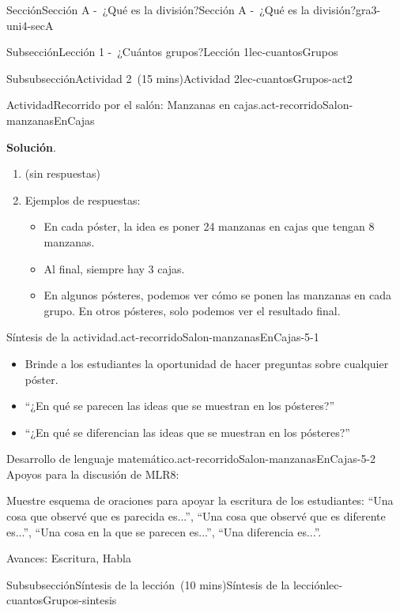 \documentclass[oneside,10pt,]{article}
\newcommand{\blocktitlefont}{\relax}
\begin{document}
\begin{sectionptx}{Sección}{Sección A -~¿Qué es la división?}{}{Sección A -~¿Qué es la división?}{}{}{gra3-uni4-secA}
\begin{subsectionptx}{Subsección}{Lección 1 -~¿Cuántos grupos?}{}{Lección 1}{}{}{lec-cuantosGrupos}
\begin{subsubsectionptx}{Subsubsección}{Actividad 2~(15 mins)}{}{Actividad 2}{}{}{lec-cuantosGrupos-act2}
\begin{activity}{Actividad}{Recorrido por el salón: Manzanas en cajas.}{act-recorridoSalon-manzanasEnCajas}
\begin{enumerate}
\end{enumerate}
%
\par\smallskip%
\noindent\textbf{\blocktitlefont Solución}.\hypertarget{act-recorridoSalon-manzanasEnCajas-3}{}\quad{}%
\begin{enumerate}
\item{}(sin respuestas)%
\item{}Ejemplos de respuestas:%
\begin{itemize}[label=\textbullet]
\item{}En cada póster, la idea es poner 24 manzanas en cajas que tengan 8 manzanas.%
\item{}Al final, siempre hay 3 cajas.%
\item{}En algunos pósteres, podemos ver cómo se ponen las manzanas en cada grupo. En otros pósteres, solo podemos ver el resultado final.%
\end{itemize}
%
\end{enumerate}
\end{activity}%
\par
\begin{paragraphs}{Síntesis de la actividad.}{act-recorridoSalon-manzanasEnCajas-5-1}%
%
\begin{itemize}[label=\textbullet]
\item{}Brinde a los estudiantes la oportunidad de hacer preguntas sobre cualquier póster.%
\item{}``¿En qué se parecen las ideas que se muestran en los pósteres?''%
\item{}``¿En qué se diferencian las ideas que se muestran en los pósteres?''%
\end{itemize}
\end{paragraphs}%
\begin{paragraphs}{Desarrollo de lenguaje matemático.}{act-recorridoSalon-manzanasEnCajas-5-2}%
Apoyos para la discusión de MLR8:%
\par
Muestre esquema de oraciones para apoyar la escritura de los estudiantes: ``Una cosa que observé que es parecida es...'', ``Una cosa que observé que es diferente es...'', ``Una cosa en la que se parecen es...'', ``Una diferencia es...''.%
\par
Avances: Escritura, Habla%
\end{paragraphs}%
\end{subsubsectionptx}
%
%
\typeout{************************************************}
\typeout{************************************************}
%
\begin{subsubsectionptx}{Subsubsección}{Síntesis de la lección~(10 mins)}{}{Síntesis de la lección}{}{}{lec-cuantosGrupos-sintesis}

\end{subsubsectionptx}
\end{subsectionptx}
\end{sectionptx}
\end{document}
